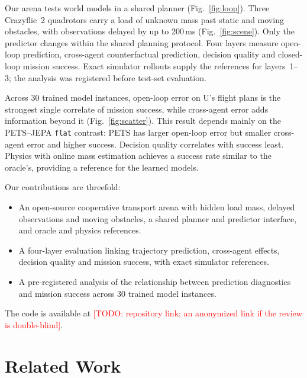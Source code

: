 \documentclass[conference]{IEEEtran}
\newcommand{\todo}[1]{\textcolor{red}{[TODO: #1]}}
\begin{document}
Our arena tests world models in a shared planner (Fig.~\ref{fig:loop}). Three Crazyflie~2 quadrotors carry a load of unknown mass past static and moving obstacles, with observations delayed by up to 200\,ms (Fig.~\ref{fig:scene}). Only the predictor changes within the shared planning protocol. Four layers measure open-loop prediction, cross-agent counterfactual prediction, decision quality and closed-loop mission success. Exact simulator rollouts supply the references for layers~1--3; the analysis was registered before test-set evaluation.

Across 30 trained model instances, open-loop error on U's flight plans is the strongest single correlate of mission success, while cross-agent error adds information beyond it (Fig.~\ref{fig:scatter}). This result depends mainly on the PETS--JEPA \texttt{flat} contrast: PETS has larger open-loop error but smaller cross-agent error and higher success. Decision quality correlates with success least. Physics with online mass estimation achieves a success rate similar to the oracle's, providing a reference for the learned models.

Our contributions are threefold:
\begin{itemize}
\item An open-source cooperative transport arena with hidden load mass, delayed observations and moving obstacles, a shared planner and predictor interface, and oracle and physics references.
\item A four-layer evaluation linking trajectory prediction, cross-agent effects, decision quality and mission success, with exact simulator references.
\item A pre-registered analysis of the relationship between prediction diagnostics and mission success across 30 trained model instances.
\end{itemize}
The code is available at \todo{repository link; an anonymized link if the review is double-blind}.

\section{Related Work}\label{sec:related}
\end{document}
